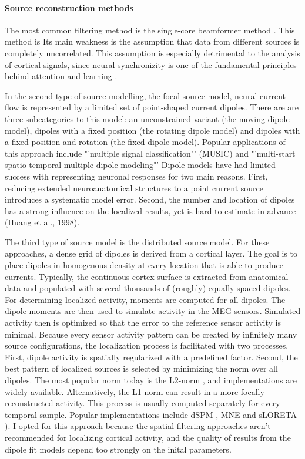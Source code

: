 \paragraph{Source reconstruction methods}
The most common filtering method is the single-core beamformer method \cite{1.5.Beamformer-a, 1.5.Beamformer-b}.
This method is 
Its main weakness is the assumption that data from different sources is completely uncorrelated.
This assumption is especially detrimental to the analysis of cortical signals, since neural synchronizity is one of the fundamental principles behind attention and learning \cite{1.5.synchronizity}.

In the second type of source modelling, the focal source model, neural current flow is represented by a limited set of point-shaped current dipoles.
There are are three subcategories to this model: an unconstrained variant (the moving dipole model), dipoles with a fixed position (the rotating dipole model) and dipoles with a fixed position and rotation (the fixed dipole model).
Popular applications of this approach include "'multiple signal classification"' (MUSIC) \cite{1.5.music} and "'multi-start spatio-temporal multiple-dipole modeling"' \cite{1.5.simplex}
Dipole models have had limited success with representing neuronal responses for two main reasons.
First, reducing extended neuroanatomical structures to a point current source introduces a systematic model error.
Second, the number and location of dipoles has a strong influence on the localized results, yet is hard to estimate in advance (Huang et al., 1998).

The third type of source model is the distributed source model.
For these approaches, a dense grid of dipoles is derived from a cortical layer.
The goal is to place dipoles in homogenous density at every location that is able to produce currents.
Typically, the continuous cortex surface is extracted from anatomical data and populated with several thousands of (roughly) equally spaced dipoles.
For determining localized activity, moments are computed for all dipoles.
The dipole moments are then used to simulate activity in the MEG sensors.
Simulated activity then is optimized so that the error to the reference sensor activity is minimal.
Because every sensor activity pattern can be created by infinitely many source configurations, the localization process is facilitated with two processes.
First, dipole activity is spatially regularized with a predefined factor.
Second, the best pattern of localized sources is selected by minimizing the norm over all dipoles.
The most popular norm today is the L2-norm \cite{1.5.L2}, and implementations are widely available.
Alternatively, the L1-norm \cite{1.5.L1} can result in a more focally reconstructed activity.
This process is usually computed separately for every temporal sample.
Popular implementations include dSPM \cite{1.5.dSPM}, MNE \cite{1.5.MNE} and sLORETA \cite{1.5.sLORETA}).
I opted for this approach because the spatial filtering approaches aren't recommended for localizing cortical activity, and the quality of results from the dipole fit models depend too strongly on the inital parameters.

